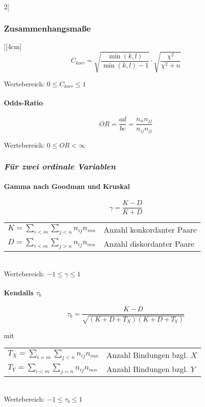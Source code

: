 \documentclass[8pt]{extarticle}
\begin{document}
\begin{multicols}{2}[\subsubsection{Zusammenhangsmaße}][4cm]
$$C_{korr}= \sqrt{\frac{\min(k,l)}{\min(k,l)-1}} \cdot \sqrt{\frac{\chi^2}{\chi^2 + n}} $$

Wertebereich: $ 0 \le C_{korr} \le 1 $

\paragraph{Odds-Ratio}

$$OR=\frac{ad}{bc} = \frac{n_{ii}n_{jj}}{n_{ij}n_{ji}}$$

Wertebereich: $0 \le OR < \infty$

\subsubsection*{\textit{Für zwei ordinale Variablen}}

\paragraph{Gamma nach Goodman und Kruskal}

$$\gamma=\frac{K-D}{K+D}$$


\begin{tabular}{l l }
$ K=\sum_{i<m}\sum_{j<n}n_{ij}n_{mn}$ & Anzahl konkordanter Paare \\
$ D=\sum_{i<m}\sum_{j>n}n_{ij}n_{mn}$ & Anzahl diskordanter Paare \\
\end{tabular}

\ \\

Wertebereich: $-1 \le \gamma \le 1$

\paragraph{Kendalls $\tau_b$}

$$ \tau_b=\frac{K-D}{\sqrt{(K+D+T_X)(K+D+T_Y)}}$$

mit

\begin{tabular}{l l } 
$ T_X=\sum_{i=m}\sum_{j<n}n_{ij}n_{mn}$ & Anzahl Bindungen bzgl. $X$ \\
$ T_Y=\sum_{i<m}\sum_{j=n}n_{ij}n_{mn}$ & Anzahl Bindungen bzgl. $Y$ \\
\end{tabular}

\ \\

Wertebereich: $-1 \le \tau_b \le 1$


\end{multicols}
\end{document}
